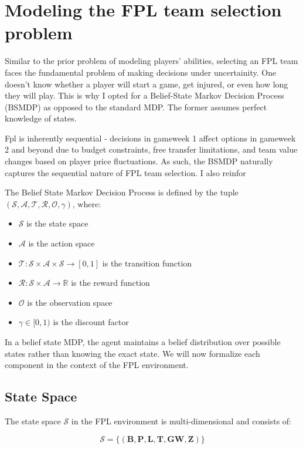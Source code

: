 \section{Modeling the FPL team selection problem}
Similar to the prior problem of modeling players' abilities, selecting an FPL team faces the fundamental problem of making decisions under uncertainity. One doesn't know whether a player will start a game, get injured, or even how long they will play. This is why I opted for a Belief-State Markov Decision Process (BSMDP) as opposed to the standard MDP. The former assumes perfect knowledge of states.

Fpl is inherently sequential - decisions in gameweek 1 affect options in gameweek 2 and beyond due to budget constraints, free transfer limitations, and team value changes based on player price fluctuations. As such, the BSMDP naturally captures the sequential nature of FPL team selection. I also reinfor

The Belief State Markov Decision Process is defined by the tuple $(\mathcal{S}, \mathcal{A}, \mathcal{T}, \mathcal{R}, \mathcal{O}, \gamma)$, where:
\begin{itemize}
    \item $\mathcal{S}$ is the state space
    \item $\mathcal{A}$ is the action space
    \item $\mathcal{T}: \mathcal{S} \times \mathcal{A} \times \mathcal{S} \rightarrow [0, 1]$ is the transition function
    \item $\mathcal{R}: \mathcal{S} \times \mathcal{A} \rightarrow \mathbb{R}$ is the reward function
    \item $\mathcal{O}$ is the observation space
    \item $\gamma \in [0, 1)$ is the discount factor
\end{itemize}

In a belief state MDP, the agent maintains a belief distribution over possible states rather than knowing the exact state. We will now formalize each component in the context of the FPL environment.

\subsection{State Space}

The state space $\mathcal{S}$ in the FPL environment is multi-dimensional and consists of:

\[\mathcal{S} = \{(\mathbf{B}, \mathbf{P}, \mathbf{L}, \mathbf{T}, \mathbf{GW}, \mathbf{Z})\}\]

